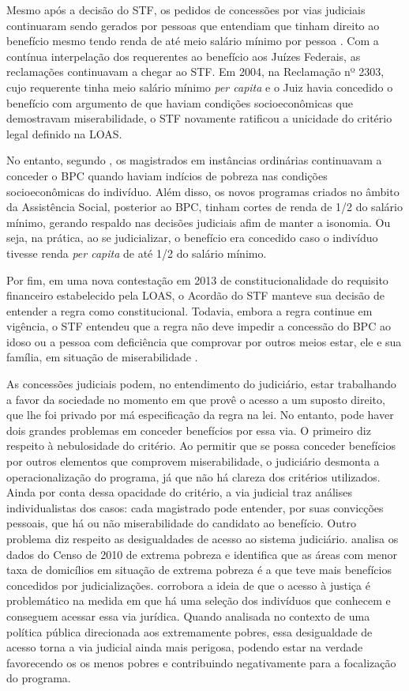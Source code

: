 \documentclass[
	12pt,				%
	openright,			%
	twoside,			%
	a4paper,			%
	english,			%
	french,				%
	spanish,			%
	brazil				%
	]{abntex2}
\begin{document}
Mesmo após a decisão do STF, os pedidos de concessões por vias judiciais continuaram sendo gerados por pessoas que entendiam que tinham direito ao benefício mesmo tendo renda de até meio salário mínimo por pessoa \cite{bpcstf}. Com a contínua interpelação dos requerentes ao benefício aos Juízes Federais, as reclamações continuavam a chegar ao STF. Em 2004, na Reclamação nº 2303, cujo requerente tinha meio salário mínimo \textit{per capita} e o Juiz havia concedido o benefício com argumento de que haviam condições socioeconômicas que demostravam miserabilidade, o STF novamente ratificou a unicidade do critério legal definido na LOAS. 

No entanto, segundo \cite{bpcstf}, os magistrados em instâncias ordinárias continuavam a conceder o BPC quando haviam indícios de pobreza nas condições socioeconômicas do indivíduo. Além disso, os novos programas criados no âmbito da Assistência Social, posterior ao BPC, tinham cortes de renda de 1/2 do salário mínimo, gerando respaldo nas decisões judiciais afim de manter a isonomia. Ou seja, na prática, ao se judicializar, o benefício era concedido caso o indivíduo tivesse renda \textit{per capita} de até 1/2 do salário mínimo. 

Por fim, em uma nova contestação em 2013 de constitucionalidade do requisito financeiro estabelecido pela LOAS, o Acordão do STF manteve sua decisão de entender a regra como constitucional. Todavia, embora a regra continue em vigência, o STF entendeu que a regra não deve impedir a concessão do BPC ao idoso ou a pessoa com deficiência que comprovar por outros meios estar, ele e sua família, em situação de miserabilidade \cite{acordaoSTFBPC}.

As concessões judiciais podem, no entendimento do judiciário, estar trabalhando a favor da sociedade no momento em que provê o acesso a um suposto direito, que lhe foi privado por má especificação da regra na lei. No entanto, pode haver dois grandes problemas em conceder benefícios por essa via. O primeiro diz respeito à nebulosidade do critério. Ao permitir que se possa conceder benefícios por outros elementos que comprovem miserabilidade, o judiciário desmonta a operacionalização do programa, já que não há clareza dos critérios utilizados. Ainda por conta dessa opacidade do critério, a via judicial traz análises individualistas dos casos: cada magistrado pode entender, por suas convicções pessoais, que há ou não miserabilidade do candidato ao benefício. Outro problema diz respeito as desigualdades de acesso ao sistema judiciário.  analisa os dados do Censo de 2010 de extrema pobreza e identifica que as áreas com menor taxa de domicílios em situação de extrema pobreza é a que teve mais benefícios concedidos por judicializações.  corrobora a ideia de que o acesso à justiça é problemático na medida em que há uma seleção dos indivíduos que conhecem e conseguem acessar essa via jurídica. Quando analisada no contexto de uma política pública direcionada aos extremamente pobres, essa desigualdade de acesso torna a via judicial ainda mais perigosa, podendo estar na verdade favorecendo os os menos pobres e contribuindo negativamente para a focalização do programa.  
\end{document}
